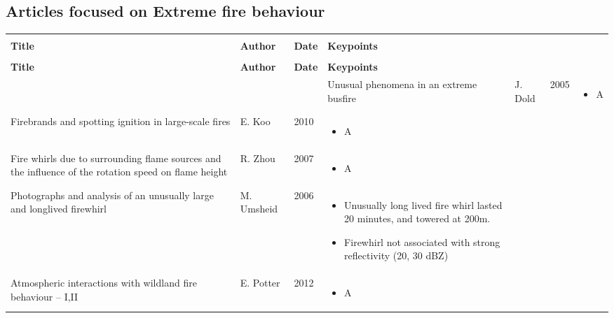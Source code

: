 \documentclass[12pt]{article}
\begin{document}
\subsection{Articles focused on Extreme fire behaviour}
\begin{center}
\begin{longtable}{|p{4.5cm}|p{2cm}|p{0.8cm}|p{7.5cm}|}

\hline
 & & & \tabularnewline
\textbf{Title} & \textbf{Author} & \textbf{Date} & \textbf{Keypoints} \tabularnewline
 & & & \endfirsthead
 \hline
 
 \hline
 & & & \tabularnewline
\textbf{Title} & \textbf{Author} & \textbf{Date} & \textbf{Keypoints} \tabularnewline
 & & & \endhead
 \hline
 
 \hline
\endlastfoot
 \hline
 
 \hline
\endfoot
 \hline
 
\raggedright Unusual phenomena in an extreme busfire & J. Dold & 2005 & \raggedleft 
\begin{itemize} 
\item A
\end{itemize} 
\tabularnewline

\hline

\raggedright Firebrands and spotting ignition in large-scale fires & E. Koo & 2010 & \raggedleft 
\begin{itemize} 
\item A
\end{itemize} 
\tabularnewline

\hline
 
\raggedright Fire whirls due to surrounding flame sources and the influence of the rotation speed on flame height & R. Zhou & 2007 & \raggedleft 
\begin{itemize} 
\item A
\end{itemize} 
\tabularnewline

\hline
 
\raggedright Photographs and analysis of an unusually large and longlived firewhirl & M. Umsheid & 2006 & \raggedleft 
\begin{itemize} 
\item Unusually long lived fire whirl lasted 20 minutes, and towered at 200m.
\item Firewhirl not associated with strong reflectivity (20, 30 dBZ)
\end{itemize} 
\tabularnewline

\hline

\raggedright Atmospheric interactions with wildland fire
behaviour – I,II & E. Potter & 2012 & \raggedleft 
\begin{itemize} 
\item A
\end{itemize} 
\tabularnewline

\hline





\end{longtable}
\end{center}
\end{document}
